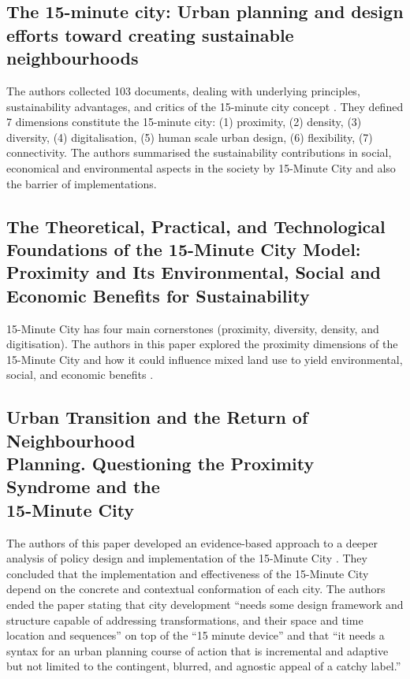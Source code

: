 \subsection{The 15-minute city: Urban planning and design efforts toward creating sustainable neighbourhoods}

The authors collected 103 documents, dealing with underlying principles, sustainability advantages, and critics of the 15-minute city concept \cite{khavarian-garmsir_15-minute_2023}. They defined 7 dimensions constitute the 15-minute city: (1) proximity, (2) density, (3) diversity, (4) digitalisation, (5) human scale
urban design, (6) flexibility, (7) connectivity. The authors summarised the sustainability contributions in social, economical and environmental aspects in the society by 15-Minute City and also the barrier of implementations.

\subsection{The Theoretical, Practical, and Technological Foundations of the 15-Minute City Model: Proximity and Its Environmental, Social and Economic Benefits for Sustainability}

15-Minute City has four main cornerstones (proximity, diversity, density, and digitisation). The authors in this paper explored the proximity dimensions of the 15-Minute City and how it could influence mixed land use to yield environmental, social, and economic benefits \cite{allam_theoretical_2022}.

\subsection{Urban Transition and the Return of Neighbourhood \\ Planning. Questioning the Proximity Syndrome and the \\ 15-Minute City}

The authors of this paper developed an evidence-based approach to a deeper analysis of policy design and implementation of the 15-Minute City \cite{marchigiani_urban_2022}. They concluded that the implementation and effectiveness of the 15-Minute City depend on the concrete and contextual conformation of each city. The authors ended the paper stating that city development “needs some design framework and structure capable of addressing transformations, and their space and time location and sequences” on top of the “15 minute device” and that “it needs a syntax for an urban planning course of action that is incremental and adaptive but not limited to the contingent, blurred, and agnostic appeal of a catchy label.”